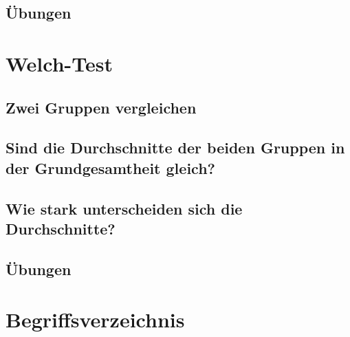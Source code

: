 \documentclass[
]{book}
\theoremstyle{definition}
\theoremstyle{definition}
\theoremstyle{definition}
\theoremstyle{definition}
\theoremstyle{remark}
\begin{document}
\section{Übungen}\label{uxfcbungen-3}

\chapter{Welch-Test}\label{welch-test}

\section{Zwei Gruppen vergleichen}\label{zwei-gruppen-vergleichen-1}

\section{Sind die Durchschnitte der beiden Gruppen in der Grundgesamtheit gleich?}\label{sind-die-durchschnitte-der-beiden-gruppen-in-der-grundgesamtheit-gleich}

\section{Wie stark unterscheiden sich die Durchschnitte?}\label{wie-stark-unterscheiden-sich-die-durchschnitte}

\section{Übungen}\label{uxfcbungen-4}

\chapter*{Begriffsverzeichnis}\label{begriffsverzeichnis}
\end{document}
